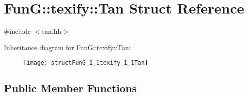 \hypertarget{structFunG_1_1texify_1_1Tan}{\section{Fun\-G\-:\-:texify\-:\-:Tan Struct Reference}
\label{structFunG_1_1texify_1_1Tan}
}


{\ttfamily \#include $<$tan.\-hh$>$}

Inheritance diagram for Fun\-G\-:\-:texify\-:\-:Tan\-:\begin{figure}[H]
\begin{center}
\leavevmode
\texttt{[image: structFunG\_1\_1texify\_1\_1Tan]}
\end{center}
\end{figure}
\subsection*{Public Member Functions}
